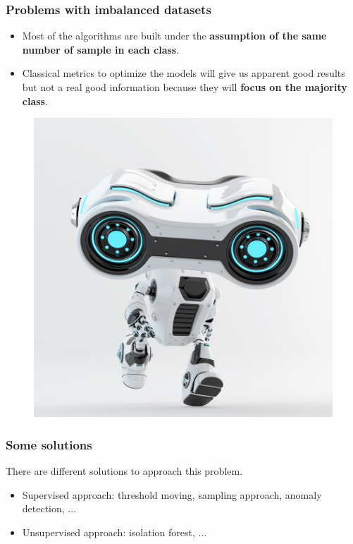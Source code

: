 \documentclass[9pt]{beamer}
\begin{document}
\begin{frame}
\frametitle{Problems with imbalanced datasets}
\begin{itemize}
\item<1 -> Most of the algorithms are built under the \textbf{assumption of the same number of sample in each class}.
\item<2 -> Classical metrics to optimize the models will give us apparent good results but not a real good information because they will \textbf{focus on the majority class}.
\end{itemize}
\begin{figure}[ht]
\includegraphics[scale=0.1]{images/look_robot.jpg}
\end{figure}
\end{frame}
\begin{frame}
\frametitle{Some solutions}
There are different solutions to approach this problem.\\
\begin{itemize}
\item<1 -> Supervised approach: threshold moving, sampling approach, anomaly detection, ...
\item<2 -> Unsupervised approach: isolation forest, ...
\end{itemize}
\end{frame}
\end{document}
